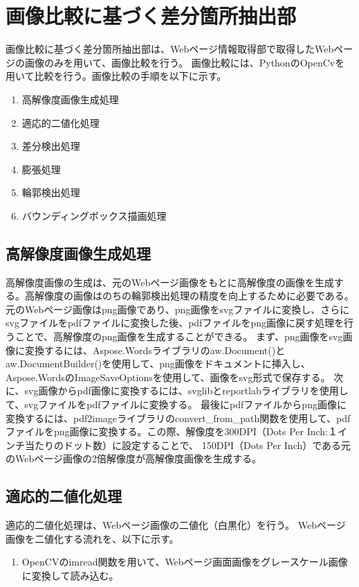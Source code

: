 \section{画像比較に基づく差分箇所抽出部}\label{sec:Difference_extraction_section}
画像比較に基づく差分箇所抽出部は、Webページ情報取得部で取得したWebページの画像のみを用いて、画像比較を行う。
画像比較には、PythonのOpenCvを用いて比較を行う。画像比較の手順を以下に示す。
\begin{enumerate}
    \item 高解像度画像生成処理
    \item 適応的二値化処理
    \item 差分検出処理
    \item 膨張処理
    \item 輪郭検出処理
    \item バウンディングボックス描画処理
\end{enumerate}

\subsection{高解像度画像生成処理}\label{subsec:Generate_high_images}
高解像度画像の生成は、元のWebページ画像をもとに高解像度の画像を生成する。高解像度の画像はのちの輪郭検出処理の精度を向上するために必要である。
元のWebページ画像はpng画像であり、png画像をsvgファイルに変換し、さらにsvgファイルをpdfファイルに変換した後、pdfファイルをpng画像に戻す処理を行うことで、高解像度のpng画像を生成することができる。
まず、png画像をsvg画像に変換するには、Aspose.Wordsライブラリのaw.Document()とaw.DocumentBuilder()を使用して、png画像をドキュメントに挿入し、Aspose.WordsのImageSaveOptionsを使用して、画像をsvg形式で保存する。
次に、svg画像からpdf画像に変換するには、svglibとreportlabライブラリを使用して、svgファイルをpdfファイルに変換する。
最後にpdfファイルからpng画像に変換するには、pdf2imageライブラリのconvert\_from\_path関数を使用して、pdfファイルをpng画像に変換する。この際、解像度を300DPI（Dots Per Inch:１インチ当たりのドット数）に設定することで、
150DPI（Dots Per Inch）である元のWebページ画像の2倍解像度が高解像度画像を生成する。


\subsection{適応的二値化処理}\label{subsec:Adaptive_Binarisation}
適応的二値化処理は、Webページ画像の二値化（白黒化）を行う。
Webページ画像を二値化する流れを、以下に示す。
\begin{enumerate}
    \item OpenCVのimread関数を用いて、Webページ画面画像をグレースケール画像に変換して読み込む。
\end{enumerate}


